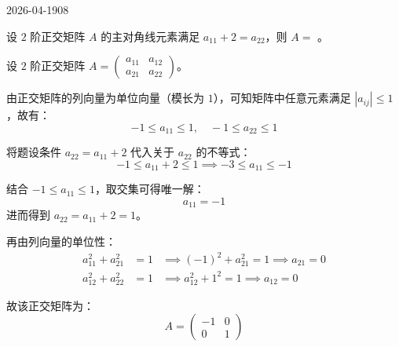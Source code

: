 \begin{mistake}{2026-04-19}{08}

\begin{problemcontent}
设 \(2\) 阶正交矩阵 \(A\) 的主对角线元素满足 \(a_{11} + 2 = a_{22}\)，则 \(A = \) \underline{\hspace{2cm}}。
\end{problemcontent}

\begin{solutioncontent}
设 \(2\) 阶正交矩阵 \(A = \begin{pmatrix} a_{11} & a_{12} \\ a_{21} & a_{22} \end{pmatrix}\)。

由正交矩阵的列向量为单位向量（模长为 \(1\)），可知矩阵中任意元素满足 \(|a_{ij}| \le 1\)，故有：
\[ -1 \le a_{11} \le 1, \quad -1 \le a_{22} \le 1 \]

将题设条件 \(a_{22} = a_{11} + 2\) 代入关于 \(a_{22}\) 的不等式：
\[ -1 \le a_{11} + 2 \le 1 \implies -3 \le a_{11} \le -1 \]

结合 \(-1 \le a_{11} \le 1\)，取交集可得唯一解：
\[ a_{11} = -1 \]
进而得到 \(a_{22} = a_{11} + 2 = 1\)。

再由列向量的单位性：
\[
\begin{aligned}
a_{11}^2 + a_{21}^2 &= 1 &\implies (-1)^2 + a_{21}^2 = 1 \implies a_{21} = 0 \\
a_{12}^2 + a_{22}^2 &= 1 &\implies a_{12}^2 + 1^2 = 1 \implies a_{12} = 0
\end{aligned}
\]

故该正交矩阵为：
\[ A = \begin{pmatrix} -1 & 0 \\ 0 & 1 \end{pmatrix} \]
\end{solutioncontent}


\end{mistake}
